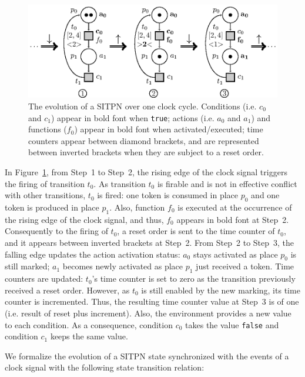 \documentclass[pdflatex,sn-mathphys]{sn-jnl}%
\theoremstyle{thmstyleone}%
\theoremstyle{thmstyletwo}%
\theoremstyle{thmstylethree}%
\begin{document}
\begin{figure}[H]
  \centering
  \includegraphics[keepaspectratio=true, width=.8\textwidth]{sitpn-state-evol.eps}
  \caption[Evolution of an SITPN over one clock cycle.]{The evolution
    of a SITPN over one clock cycle. Conditions (i.e. $c_0$ and $c_1$)
    appear in bold font when \texttt{true}; actions (i.e. $a_0$ and
    $a_1$) and functions ($f_0$) appear in bold font when
    activated/executed; time counters appear between diamond brackets,
    and are represented between inverted brackets when they are
    subject to a reset order.}
  \label{fig:sitpn-state-exec}
\end{figure}

In Figure~\ref{fig:sitpn-state-exec}, from Step~1 to Step~2, the
rising edge of the clock signal triggers the firing of transition
$t_0$. As transition $t_0$ is firable and is not in effective conflict
with other transitions, $t_0$ is fired: one token is consumed in place
$p_0$ and one token is produced in place $p_1$. Also, function $f_0$
is executed at the occurrence of the rising edge of the clock signal,
and thus, $f_0$ appears in bold font at Step~2. Consequently to the
firing of $t_0$, a reset order is sent to the time counter of $t_0$,
and it appears between inverted brackets at Step~2. From Step~2 to
Step~3, the falling edge updates the action activation status: $a_0$
stays activated as place $p_0$ is still marked; $a_1$ becomes newly
activated as place $p_1$ just received a token. Time counters are
updated: $t_0$'s time counter is set to zero as the transition
previously received a reset order. However, as $t_0$ is still enabled
by the new marking, its time counter is incremented. Thus, the
resulting time counter value at Step~3 is of one (i.e. result of reset
plus increment). Also, the environment provides a new value to each
condition. As a consequence, condition $c_0$ takes the value
\texttt{false} and condition $c_1$ keeps the same value.

We formalize the evolution of a SITPN state synchronized with the
events of a clock signal with the following state transition relation:
\end{document}
